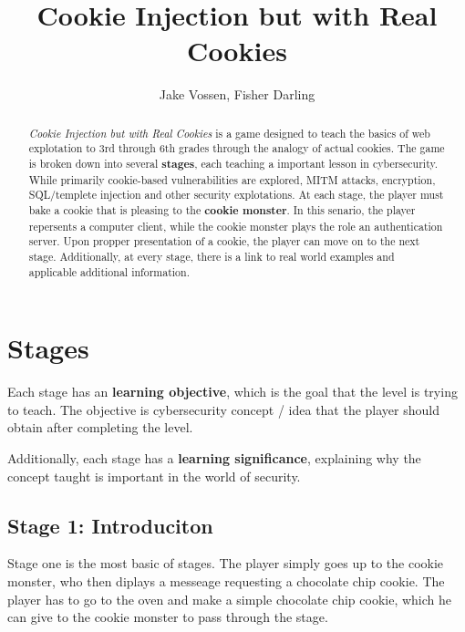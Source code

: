 \documentclass{article}
\begin{document}
\title{Cookie Injection but with Real Cookies}
\author{Jake Vossen, Fisher Darling}

\maketitle

\begin{abstract}
  
\textit{Cookie Injection but with Real Cookies} is a
game designed to teach the basics of web explotation to 3rd through
6th grades through the analogy of actual cookies. The game is broken
down into several \textbf{stages}, each teaching a important lesson in
cybersecurity. While primarily cookie-based vulnerabilities are
explored, MITM attacks, encryption, SQL/templete injection and other
security explotations. At each stage, the player must bake a cookie
that is pleasing to the \textbf{cookie monster}. In this senario, the
player repersents a computer client, while the cookie monster plays
the role an authentication server. Upon propper presentation of a
cookie, the player can move on to the next stage. Additionally, at
every stage, there is a link to real world examples and applicable
additional information.

\end{abstract}

\section{Stages}

Each stage has an \textbf{learning objective}, which is the goal that
the level is trying to teach. The objective is cybersecurity concept /
idea that the player should obtain after completing the level.

Additionally, each stage has a \textbf{learning significance},
explaining why the concept taught is important in the world of security.

\subsection{Stage 1: Introduciton}

Stage one is the most basic of stages. The player simply goes up to
the cookie monster, who then diplays a messeage requesting a chocolate
chip cookie. The player has to go to the oven and make a simple
chocolate chip cookie, which he can give to the cookie monster to pass
through the stage.
\end{document}
